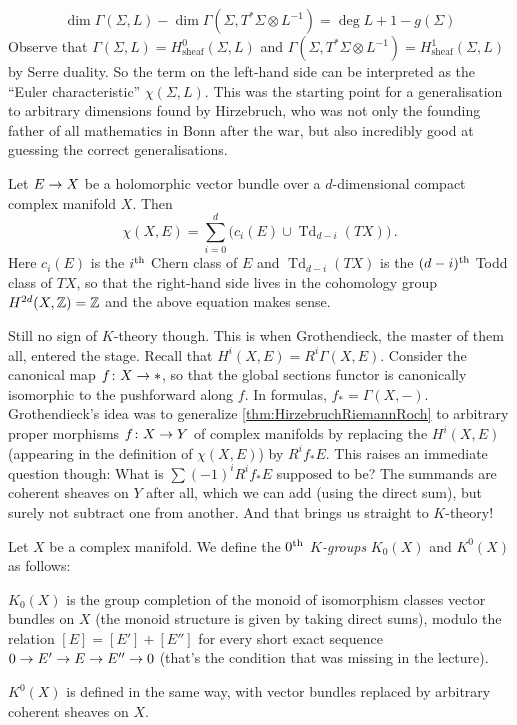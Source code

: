 	\begin{equation*}
		\dim\Gamma(\Sigma,L)-\dim \Gamma\left(\Sigma,T^*\Sigma\otimes L^{-1}\right)=\deg L+1-g(\Sigma)
	\end{equation*}
	Observe that $\Gamma(\Sigma,L)=H_\mathrm{sheaf}^0(\Sigma,L)$ and $\Gamma(\Sigma,T^*\Sigma\otimes L^{-1})=H_\mathrm{sheaf}^1(\Sigma,L)$ by Serre duality. So the term on the left-hand side can be interpreted as the \enquote{Euler characteristic} $\chi(\Sigma,L)$. This was the starting point for a generalisation to arbitrary dimensions found by Hirzebruch, who was not only the founding father of all mathematics in Bonn after the war, but also incredibly good at guessing the correct generalisations.
	\begin{thm}\label{thm:HirzebruchRiemannRoch}
		Let $E\morphism X$ be a holomorphic vector bundle over a $d$-dimensional compact complex manifold $X$. Then
		\begin{equation*}
			\chi(X,E)=\sum_{i=0}^d\big(c_i(E)\cup \operatorname{Td}_{d-i}(TX)\big)\,.
		\end{equation*}
		Here $c_i(E)$ is the $i^{\text{th}}$ Chern class of $E$ and $\operatorname{Td}_{d-i}(TX)$ is the $(d-i)^{\text{th}}$ Todd class of $TX$, so that the right-hand side lives in the cohomology group $H^{2d}(X,\mathbb{Z})=\mathbb{Z}$ and the above equation makes sense.
	\end{thm}
	Still no sign of $K$-theory though. This is when Grothendieck, the master of them all, entered the stage. 
	Recall that $H^i(X,E)=R^i\Gamma(X,E)$. Consider the canonical map $f\colon X\morphism *$, so that the global sections functor is canonically isomorphic to the pushforward along $f$. In formulas,  $f_*=\Gamma(X,-)$. Grothendieck's idea was to generalize \cref{thm:HirzebruchRiemannRoch} to arbitrary proper morphisms $f\colon X\morphism Y$ of complex manifolds by replacing the $H^i(X,E)$ (appearing in the definition of $\chi(X,E)$) by $R^if_*E$. This raises an immediate question though: What is $\sum(-1)^iR^if_*E$ supposed to be? The summands are coherent sheaves on $Y$ after all, which we can add (using the direct sum), but surely not subtract one from another. And that brings us straight to $K$-theory!
	\begin{defi}\label{def:K0X}
		Let $X$ be a complex manifold. We define the \emph{$0^{\text{th}}$ $K$-groups} $K_0(X)$ and $K^0(X)$ as follows:
		\begin{alphanumerate}
			\item $K_0(X)$ is the group completion of the monoid of isomorphism classes vector bundles on $X$ (the monoid structure is given by taking direct sums), modulo the relation $[E]=[E']+[E'']$ for every short exact sequence $0\morphism E'\morphism E\morphism E''\morphism 0$ (that's the condition that was missing in the lecture).
			\item $K^0(X)$ is defined in the same way, with vector bundles replaced by arbitrary coherent sheaves on $X$.
		\end{alphanumerate}
	\end{defi}
